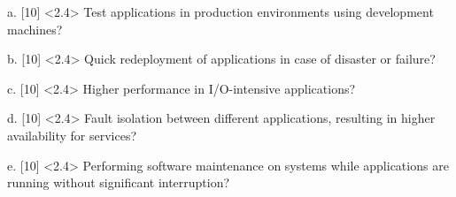 \documentclass{article}
\begin{document}
a. [10] <2.4> Test applications in production environments using development machines?

b. [10] <2.4> Quick redeployment of applications in case of disaster or failure?

c. [10] <2.4> Higher performance in I/O-intensive applications?

d. [10] <2.4> Fault isolation between different applications, resulting in higher availability for services?

e. [10] <2.4> Performing software maintenance on systems while applications are running without significant interruption?
\end{document}

